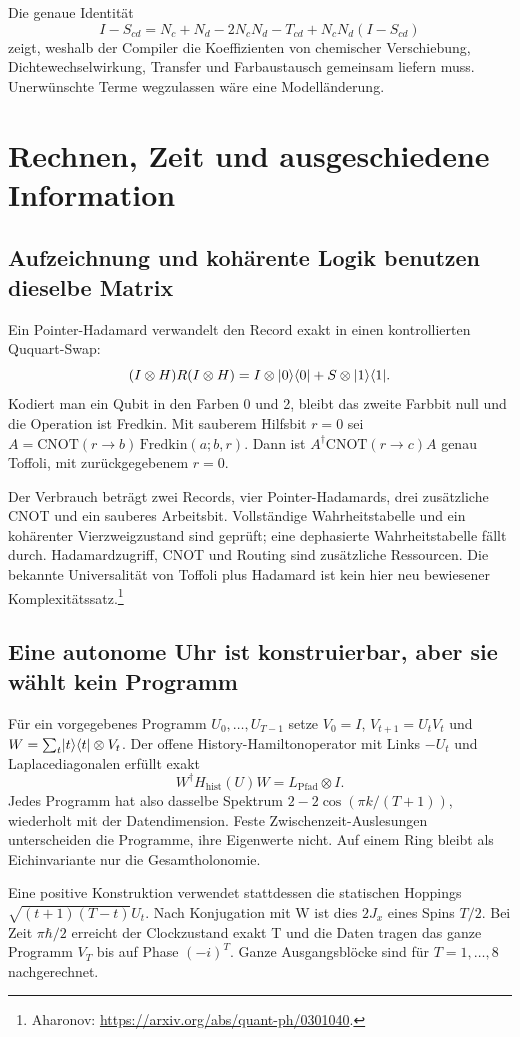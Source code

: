 Die genaue Identität
\[
I-S_{cd}=N_c+N_d-2N_cN_d-T_{cd}+N_cN_d(I-S_{cd})
\]
zeigt, weshalb der Compiler die Koeffizienten von chemischer Verschiebung, Dichtewechselwirkung, Transfer und Farbaustausch gemeinsam liefern muss. Unerwünschte Terme wegzulassen wäre eine Modelländerung.

\chapter{Rechnen, Zeit und ausgeschiedene Information}
\label{ch:clock15}
\section{Aufzeichnung und kohärente Logik benutzen dieselbe Matrix}
Ein Pointer-Hadamard verwandelt den Record exakt in einen kontrollierten Ququart-Swap:
\[
(I\otimes H)R(I\otimes H)
=I\otimes\lvert0\rangle\langle0\rvert+S\otimes\lvert1\rangle\langle1\rvert.
\]
Kodiert man ein Qubit in den Farben 0 und 2, bleibt das zweite Farbbit null und die Operation ist Fredkin. Mit sauberem Hilfsbit $r=0$ sei $A=\mathrm{CNOT}(r\to b)\,\mathrm{Fredkin}(a;b,r)$. Dann ist $A^\dagger\mathrm{CNOT}(r\to c)A$ genau Toffoli, mit zurückgegebenem $r=0$.

Der Verbrauch beträgt zwei Records, vier Pointer-Hadamards, drei zusätzliche CNOT und ein sauberes Arbeitsbit. Vollständige Wahrheitstabelle und ein kohärenter Vierzweigzustand sind geprüft; eine dephasierte Wahrheitstabelle fällt durch. Hadamardzugriff, CNOT und Routing sind zusätzliche Ressourcen. Die bekannte Universalität von Toffoli plus Hadamard ist kein hier neu bewiesener Komplexitätssatz.\footnote{Aharonov: \url{https://arxiv.org/abs/quant-ph/0301040}.}

\section{Eine autonome Uhr ist konstruierbar, aber sie wählt kein Programm}
Für ein vorgegebenes Programm $U_0,\ldots,U_{T-1}$ setze $V_0=I$, $V_{t+1}=U_tV_t$ und $W=\sum_t\lvert t\rangle\langle t\rvert\otimes V_t$. Der offene History-Hamiltonoperator mit Links $-U_t$ und Laplacediagonalen erfüllt exakt
\[
W^\dagger H_\mathrm{hist}(U)W=L_\mathrm{Pfad}\otimes I.
\]
Jedes Programm hat also dasselbe Spektrum $2-2\cos(\pi k/(T+1))$, wiederholt mit der Datendimension. Feste Zwischenzeit-Auslesungen unterscheiden die Programme, ihre Eigenwerte nicht. Auf einem Ring bleibt als Eichinvariante nur die Gesamtholonomie.

Eine positive Konstruktion verwendet stattdessen die statischen Hoppings $\sqrt{(t+1)(T-t)}U_t$. Nach Konjugation mit W ist dies $2J_x$ eines Spins $T/2$. Bei Zeit $\pi\hbar/2$ erreicht der Clockzustand exakt T und die Daten tragen das ganze Programm $V_T$ bis auf Phase $(-i)^T$. Ganze Ausgangsblöcke sind für $T=1,\ldots,8$ nachgerechnet.

